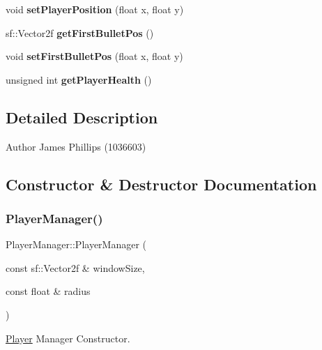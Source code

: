 \begin{DoxyCompactItemize}
\mbox{\label{class_player_manager_afbce199fe8a661b8002ae94b8396c7aa}} 
void {\bfseries set\+Player\+Position} (float x, float y)
\item 
\mbox{\label{class_player_manager_a1e058a4c38ae4b17a8541feb40247d06}} 
sf\+::\+Vector2f {\bfseries get\+First\+Bullet\+Pos} ()
\item 
\mbox{\label{class_player_manager_ae654ee04f5d9820cbb4c6b91161cc7a2}} 
void {\bfseries set\+First\+Bullet\+Pos} (float x, float y)
\item 
\mbox{\label{class_player_manager_a1e1d29acf1a54f18fafe6a2a91c67ee7}} 
unsigned int {\bfseries get\+Player\+Health} ()
\end{DoxyCompactItemize}


\subsection{Detailed Description}
\begin{DoxyAuthor}{Author}
James Phillips (1036603) 
\end{DoxyAuthor}


\subsection{Constructor \& Destructor Documentation}
\mbox{\label{class_player_manager_aa2ce60af19b9d80bd884e2edaea726d6}} 
\subsubsection{\texorpdfstring{Player\+Manager()}{PlayerManager()}}
{\footnotesize\ttfamily Player\+Manager\+::\+Player\+Manager (\begin{DoxyParamCaption}\item[{const sf\+::\+Vector2f \&}]{window\+Size,  }\item[{const float \&}]{radius }\end{DoxyParamCaption})}



\hyperlink{class_player}{Player} Manager Constructor. 


